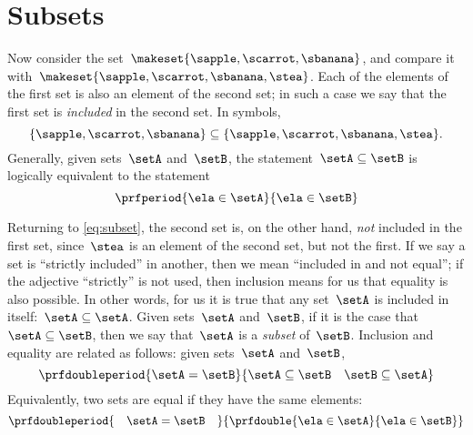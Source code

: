 \section{Subsets}
Now consider the set~$\makeset{ \sapple, \scarrot, \sbanana }$, and compare it with~$\makeset{ \sapple, \scarrot, \sbanana, \stea }$.
Each of the elements of the first set is also an element of the second set;
in such a case we say that the first set is \emph{included} in the second set.
In symbols,
%
\begin{equation}
	\label{eq:subset}
	\{ \sapple, \scarrot, \sbanana \} \subseteq \{ \sapple, \scarrot, \sbanana, \stea \}.
\end{equation}
%
Generally, given sets~$\setA$ and~$\setB$, the statement~$\setA \subseteq \setB$ is logically equivalent to the statement
%
\begin{equation*}
	\prfperiod{
		\ela \in \setA
	}{
		\ela \in \setB
	}
\end{equation*}

Returning to \cref{eq:subset}, the second set is, on the other hand, \emph{not} included in the first set, since~$\stea$ is an element of the second set, but not the first.
If we say a set is ``strictly included'' in another, then we mean ``included in and not equal'';
if the adjective ``strictly'' is not used, then inclusion means for us that equality is also possible.
In other words, for us it is true that any set~$\setA$ is included in itself:~$\setA \subseteq \setA$.
Given sets~$\setA$ and~$\setB$, if it is the case that~$\setA \subseteq \setB$, then we say that~$\setA$ is a \emph{subset} of~$\setB$.
Inclusion and equality are related as follows: given sets~$\setA$ and~$\setB$,
%
\begin{equation*}
	\prfdoubleperiod{
		\setA = \setB
	}{
		{\setA \subseteq \setB}
		\quad
		{\setB \subseteq \setA}
	}
\end{equation*}
%
Equivalently, two sets are equal if they have the same elements:
\begin{equation*}
	\prfdoubleperiod{
		\quad \setA = \setB \quad
	}{
		\prfdouble{
			\ela \in \setA
		}{
			\ela \in \setB
		}
	}
\end{equation*}
